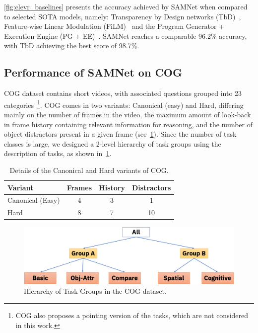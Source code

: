 \cref{fig:clevr_baselines} presents the accuracy achieved by SAMNet when compared to selected SOTA models, namely: Transparency by Design networks (TbD)~\cite{mascharka2018transparency}, Feature-wise Linear Modulation (FiLM)~\cite{perez2018film} and the Program Generator + Execution Engine (PG + EE)~\cite{johnson2017inferring}.
SAMNet reaches a comparable 96.2\% accuracy, with TbD achieving the best score of 98.7\%.


\subsection{Performance of SAMNet on COG}
\label{sec:cog-baseline-compare}

COG dataset contains short videos, with associated questions grouped into 23 categories~\footnote{COG also proposes a pointing version of the tasks, which are not considered in this work.}.
COG comes in two variants: Canonical (easy) and Hard, differing mainly on the number of frames in the video, the maximum amount of look-back in frame history containing relevant information for reasoning, and the number of object distractors present in a given frame (see~\cref{tab:cog_variants}).
Since the number of task classes is large, we designed a 2-level hierarchy of task groups using the
description of tasks, as shown in~\cref{fig:task-groups}.

\begin{table}[htbp]
	\centering
	\begin{tabular}{lccc}
		\toprule
		Variant	& Frames & History	& Distractors \\
		\midrule
		Canonical (Easy) & 4 & 3 & 1\\
		Hard  & 8 & 7 & 10\\
		\bottomrule
	\end{tabular}
	\caption{Details of the Canonical and Hard variants of COG.}
	\label{tab:cog_variants}
\end{table}


\begin{figure}[b!]
	\centering
	\includegraphics[width=0.5\columnwidth]{../img/architecture/hierarchy}
	\caption{Hierarchy of Task Groups in the COG dataset.}
	\label{fig:task-groups}
\end{figure}



